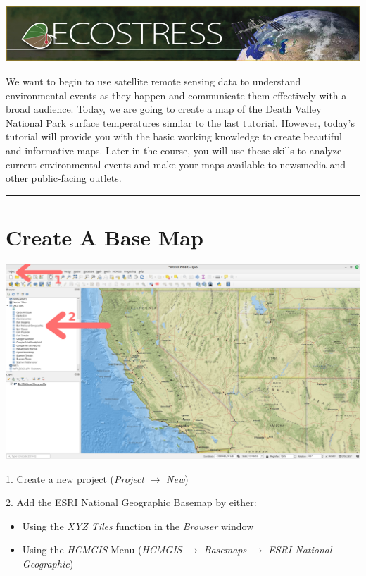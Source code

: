 \documentclass[oneside,a4paper,11pt,explicit]{book}
\begin{document}
\vspace{1 em}

{\centering

\includegraphics[width=\textwidth]{ecostress_banner.jpg}}

\vspace{1 em}

We want to begin to use satellite remote sensing data to understand environmental events as they happen and communicate them effectively with a broad audience. Today, we are going to create a  map of the Death Valley National Park surface temperatures similar to the last tutorial. However, today's tutorial will provide you with the basic working knowledge to create beautiful and informative maps. Later in the course, you will use these skills to analyze current environmental events and make your maps available to newsmedia and other public-facing outlets. 

\vspace{1 em}

\hrule

\section{Create A Base Map}

\centerline{\includegraphics[width=\textwidth]{Basemap.png}}

1. Create a new project (\textit{Project} $\rightarrow$ \textit{New})

\begin{singlespace}
2. Add the ESRI National Geographic Basemap by either:
	\begin{itemize}
		\item Using the \textit{XYZ Tiles} function in the \textit{Browser} window
		\item Using the \textit{HCMGIS} Menu (\textit{HCMGIS} $\rightarrow$ \textit{Basemaps} $\rightarrow$ \textit{ESRI National Geographic})
	\end{itemize}
\end{singlespace}
\end{document}
